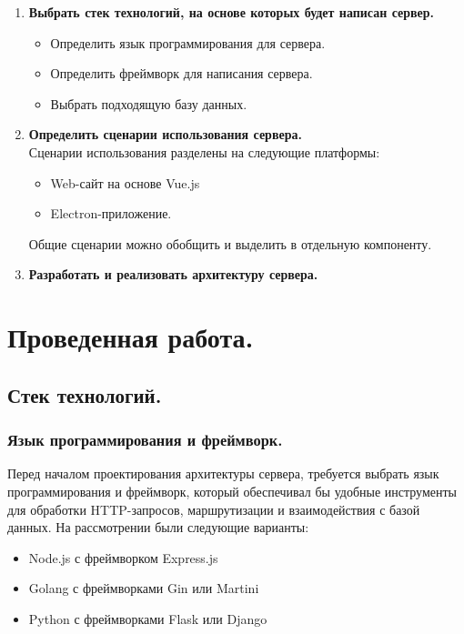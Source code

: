 \documentclass[12pt, russian]{extarticle}
\begin{document}
\begin{spacing}{1.5}
    \begin{enumerate}
        \item \textbf{Выбрать стек технологий, на основе которых будет написан сервер.}
            \begin{itemize}
                \item Определить язык программирования для сервера.
                \item Определить фреймворк для написания сервера.
                \item Выбрать подходящую базу данных.
            \end{itemize}
        \item \textbf{Определить сценарии использования сервера.} \\
            Сценарии использования разделены на следующие платформы:
            \begin{itemize}
                \item Web-сайт на основе Vue.js
                \item Electron-приложение.
            \end{itemize}
            Общие сценарии можно обобщить и выделить в отдельную компоненту.
        \item \textbf{Разработать и реализовать архитектуру сервера.}
    \end{enumerate}

    \newpage
    \section{Проведенная работа.}

    \subsection{Стек технологий.}

    \subsubsection{Язык программирования и фреймворк.}

    Перед началом проектирования архитектуры сервера, требуется выбрать язык программирования
    и фреймворк, который обеспечивал бы удобные инструменты для обработки HTTP-запросов,
    маршрутизации и взаимодействия с базой данных. На рассмотрении были следующие варианты:

    \begin{itemize}
        \item Node.js с фреймворком Express.js
        \item Golang с фреймворками Gin или Martini
        \item Python с фреймворками Flask или Django
    \end{itemize}


\end{spacing}
\end{document}
